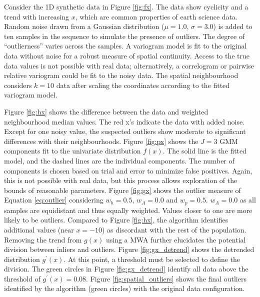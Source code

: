 Consider the \gls{1D} synthetic data in Figure \ref{fig:fx}. The data show cyclicity and a trend with increasing $x$, which are common properties of earth science data. Random noise drawn from a Gaussian distribution ($\mu=1.0$, $\sigma=3.0$) is added to ten samples in the sequence to simulate the presence of outliers. The degree of ``outlierness'' varies across the samples. A variogram model is fit to the original data without noise for a robust measure of spatial continuity. Access to the true data values is not possible with real data; alternatively, a correlogram or pairwise relative variogram could be fit to the noisy data. The spatial neighbourhood considers $k=10$ data after scaling the coordinates according to the fitted variogram model.

Figure \ref{fig:hx} shows the difference between the data and weighted neighbourhood median values. The red x's indicate the data with added noise. Except for one noisy value, the suspected outliers show moderate to significant differences with their neighbourhoods. Figure \ref{fig:px} shows the $J=3$ \gls{GMM} components fit to the univariate distribution $f(x)$. The solid line is the fitted model, and the dashed lines are the individual components. The number of components is chosen based on trial and error to minimize false positives. Again, this is not possible with real data, but this process allows exploration of the bounds of reasonable parameters. Figure \ref{fig:gx} shows the outlier measure of Equation \ref{eq:outlier} considering $w_{h}=0.5$, $w_{A}=0.0$ and $w_{p}=0.5$. $w_{A}=0.0$ as all samples are equidistant and thus equally weighted. Values closer to one are more likely to be outliers. Compared to Figure \ref{fig:hx}, the algorithm identifies additional values (near $x=-10$) as discordant with the rest of the population. Removing the trend from $g(x)$ using a \gls{MWA} further elucidates the potential division between inliers and outliers. Figure \ref{fig:gx_detrend} shows the detrended distribution $g^{\prime}(x)$. At this point, a threshold must be selected to define the division. The green circles in Figure \ref{fig:gx_detrend} identify all data above the threshold of $g^{\prime}(x)=0.08$. Figure \ref{fig:spatial_outliers} shows the final outliers identified by the algorithm (green circles) with the original data configuration.

